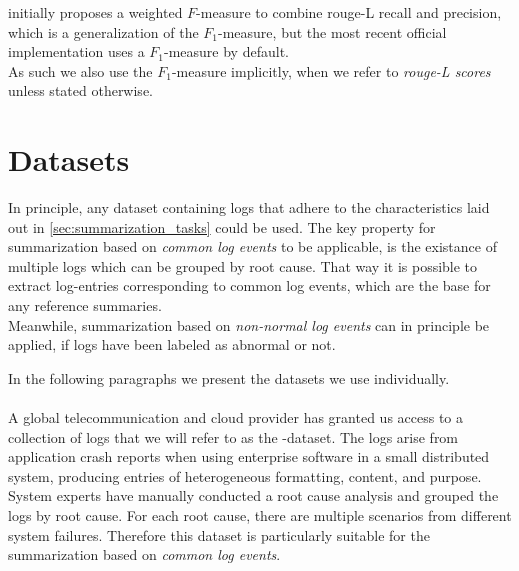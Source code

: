 \parencite{rouge} initially proposes a weighted \(F\)-measure to combine \acs*{rouge}-L recall and precision,
which is a generalization of the \(F_1\)-measure,
but the most recent official implementation uses a \(F_1\)-measure by default.\\
As such we also use the \(F_1\)-measure implicitly,
when we refer to \emph{\acs*{rouge}-L scores} unless stated otherwise.

\section{Datasets}\label{sec:datasets}

In principle, any dataset containing logs that adhere to the characteristics laid out in \autoref{sec:summarization_tasks} could be used.
The key property for summarization based on \emph{common log events} to be applicable,
is the existance of multiple logs which can be grouped by root cause.
That way it is possible to extract log-entries corresponding to common log events,
which are the base for any reference summaries.\\
Meanwhile, summarization based on \emph{non-normal log events} can in principle be applied,
if logs have been labeled as abnormal or not.

In the following paragraphs we present the datasets we use individually.

\paragraph{\telco{}}

A global telecommunication and cloud provider has granted us access
to a collection of logs that we will refer to as the \telco{}-dataset.
The logs arise from application crash reports when using enterprise software in a small distributed system,
producing entries of heterogeneous formatting, content, and purpose.
System experts have manually conducted a root cause analysis and grouped the logs by root cause.
For each root cause, there are multiple scenarios from different system failures.
Therefore this dataset is particularly suitable for the summarization based on \emph{common log events}.


